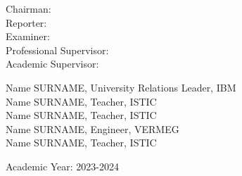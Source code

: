 \begin{titlepage}
\begin{flushleft}
\begin{minipage}[c]{0.3\columnwidth}
Chairman:\\
Reporter:\\
Examiner:\\
Professional Supervisor:\\
Academic Supervisor:
\end{minipage}
\begin{minipage}[c]{0.6\columnwidth}
Name SURNAME, University Relations Leader, IBM\\
Name SURNAME, Teacher, ISTIC\\
Name SURNAME, Teacher, ISTIC\\
Name SURNAME, Engineer, VERMEG\\
Name SURNAME, Teacher, ISTIC
\end{minipage}
 \end{flushleft}

\vskip1.5cm

{\large Academic Year: 2023-2024}\\[3cm] 


\vfill %

\end{titlepage}
%